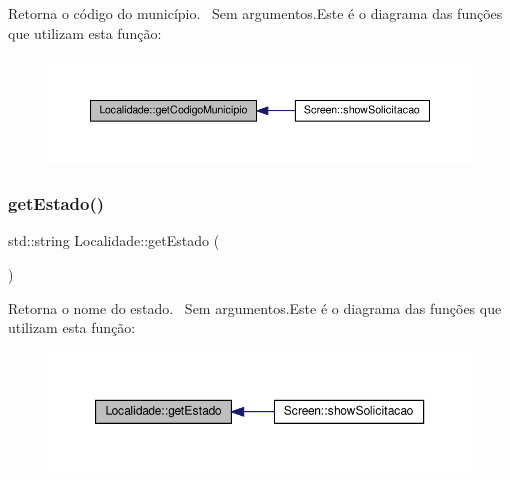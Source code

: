 Retorna o código do município.~\newline
Sem argumentos.Este é o diagrama das funções que utilizam esta função\+:\nopagebreak
\begin{figure}[H]
\begin{center}
\leavevmode
\includegraphics[width=350pt]{classLocalidade_af83a061d36464f5d91fefa5b68206112_icgraph}
\end{center}
\end{figure}
\mbox{\label{classLocalidade_a3e32ae1802d8bd09568599f5133028d3}} 
\subsubsection{\texorpdfstring{get\+Estado()}{getEstado()}}
{\footnotesize\ttfamily std\+::string Localidade\+::get\+Estado (\begin{DoxyParamCaption}{ }\end{DoxyParamCaption})}

Retorna o nome do estado.~\newline
Sem argumentos.Este é o diagrama das funções que utilizam esta função\+:\nopagebreak
\begin{figure}[H]
\begin{center}
\leavevmode
\includegraphics[width=350pt]{classLocalidade_a3e32ae1802d8bd09568599f5133028d3_icgraph}
\end{center}
\end{figure}
\mbox{\label{classLocalidade_a1548cf9f09eca346af5bdcc4c6f222b6}} 
